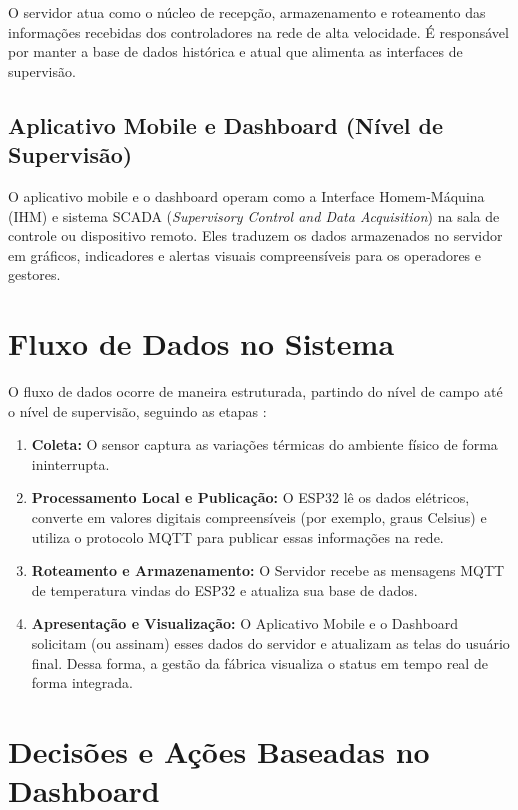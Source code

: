 \documentclass[12pt,a4paper,oneside]{article}
\begin{document}
O servidor atua como o núcleo de recepção, armazenamento e roteamento das informações recebidas dos controladores na rede de alta velocidade. É responsável por manter a base de dados histórica e atual que alimenta as interfaces de supervisão.

\subsection{Aplicativo Mobile e Dashboard (Nível de Supervisão)}

O aplicativo mobile e o dashboard operam como a Interface Homem-Máquina (IHM) e sistema SCADA (\textit{Supervisory Control and Data Acquisition}) na sala de controle ou dispositivo remoto. Eles traduzem os dados armazenados no servidor em gráficos, indicadores e alertas visuais compreensíveis para os operadores e gestores.

\section{Fluxo de Dados no Sistema}

O fluxo de dados ocorre de maneira estruturada, partindo do nível de campo até o nível de supervisão, seguindo as etapas \cite{groover2011}:

\begin{enumerate}
  \item \textbf{Coleta:} O sensor captura as variações térmicas do ambiente físico de forma ininterrupta.
  \item \textbf{Processamento Local e Publicação:} O ESP32 lê os dados elétricos, converte em valores digitais compreensíveis (por exemplo, graus Celsius) e utiliza o protocolo MQTT para publicar essas informações na rede.
  \item \textbf{Roteamento e Armazenamento:} O Servidor recebe as mensagens MQTT de temperatura vindas do ESP32 e atualiza sua base de dados.
  \item \textbf{Apresentação e Visualização:} O Aplicativo Mobile e o Dashboard solicitam (ou assinam) esses dados do servidor e atualizam as telas do usuário final. Dessa forma, a gestão da fábrica visualiza o status em tempo real de forma integrada.
\end{enumerate}

\section{Decisões e Ações Baseadas no Dashboard}
\end{document}
